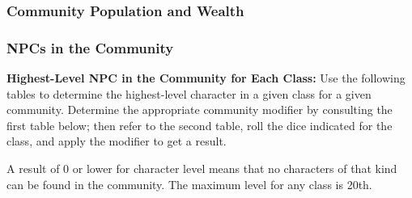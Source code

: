\subsubsection{Community Population and Wealth}
\subsubsection{NPCs in the Community}
\textbf{Highest-Level NPC in the Community for Each Class:} Use the following tables to determine the highest-level character in a given class for a given community. Determine the appropriate community modifier by consulting the first table below; then refer to the second table, roll the dice indicated for the class, and apply the modifier to get a result.

A result of 0 or lower for character level means that no characters of that kind can be found in the community. The maximum level for any class is 20th.



